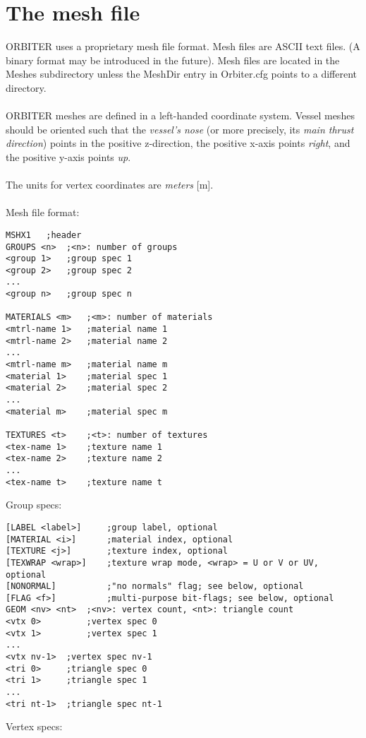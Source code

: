 \documentclass[Orbiter Developer Manual.tex]{subfiles}
\begin{document}
\section{The mesh file}
ORBITER uses a proprietary mesh file format. Mesh files are ASCII text files. (A binary format may be introduced in the future). Mesh files are located in the Meshes subdirectory unless the MeshDir entry in Orbiter.cfg points to a different directory.\\
\\
ORBITER meshes are defined in a left-handed coordinate system. Vessel meshes should be oriented such that the \textit{vessel’s nose} (or more precisely, its \textit{main thrust direction}) points in the positive z-direction, the positive x-axis points \textit{right}, and the positive y-axis points \textit{up}.\\
\\
The units for vertex coordinates are \textit{meters} [m].\\
\\
Mesh file format:
\begin{lstlisting}[language=MESH]
MSHX1	;header
GROUPS <n>	;<n>: number of groups
<group 1>	;group spec 1
<group 2>	;group spec 2
...
<group n>	;group spec n

MATERIALS <m>	;<m>: number of materials
<mtrl-name 1>	;material name 1
<mtrl-name 2>	;material name 2
...
<mtrl-name m>	;material name m
<material 1>	;material spec 1
<material 2>	;material spec 2
...
<material m>	;material spec m

TEXTURES <t>	;<t>: number of textures
<tex-name 1>	;texture name 1
<tex-name 2>	;texture name 2
...
<tex-name t>	;texture name t
\end{lstlisting}

\noindent
Group specs:

\begin{lstlisting}[language=MESH]
[LABEL <label>]		;group label, optional
[MATERIAL <i>]		;material index, optional
[TEXTURE <j>]		;texture index, optional
[TEXWRAP <wrap>]	;texture wrap mode, <wrap> = U or V or UV, optional
[NONORMAL]			;"no normals" flag; see below, optional
[FLAG <f>]			;multi-purpose bit-flags; see below, optional
GEOM <nv> <nt>	;<nv>: vertex count, <nt>: triangle count
<vtx 0>			;vertex spec 0
<vtx 1>			;vertex spec 1
...
<vtx nv-1>	;vertex spec nv-1
<tri 0>		;triangle spec 0
<tri 1>		;triangle spec 1
...
<tri nt-1>	;triangle spec nt-1
\end{lstlisting}

\noindent
Vertex specs:
\end{document}
